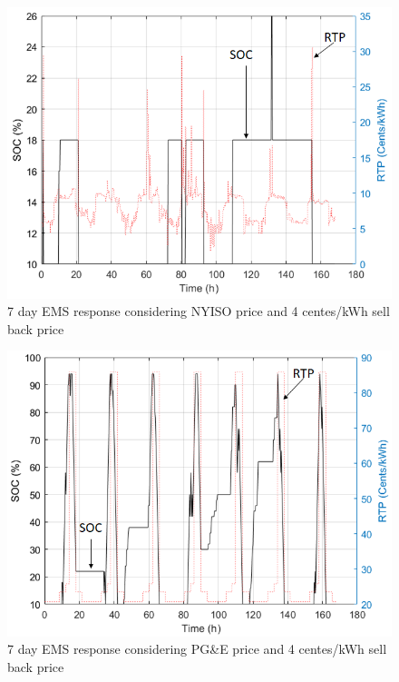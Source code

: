  \begin{figure}[!ht]
    \centering
    \includegraphics[width = \linewidth]{figs/A8/VAR_10_12_4.png}
    \caption{7 day EMS response considering NYISO price and 4 centes/kWh sell back price}
    \label{fig:VAR_10_12_4}
\end{figure}


 \begin{figure}[!ht]
    \centering
    \includegraphics[width = \linewidth]{figs/A8/PG_VAR_10_12_4.png}
    \caption{7 day EMS response considering PG\&E price and 4 centes/kWh sell back price}
    \label{fig:PG_VAR_10_12_4}
\end{figure}

